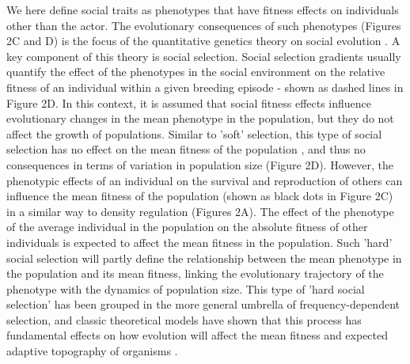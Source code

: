 \documentclass{article}
\begin{document}
We here define social traits as phenotypes that have fitness effects on individuals other than the actor. The evolutionary consequences of such phenotypes  (Figures 2C and D) is the focus of the quantitative genetics theory on social evolution \citep{frank1998foundations, Araya-Ajoy2020}. A key component of this theory is social selection. Social selection gradients usually quantify the effect of the phenotypes in the social environment on the relative fitness of an individual within a given breeding episode \citep{Wolf1999SocialSelection} - shown as dashed lines in Figure 2D. In this context, it is assumed that social fitness effects influence evolutionary changes in the mean phenotype in the population, but they do not affect the growth of populations. Similar to 'soft' selection, this type of social selection has no effect on the mean fitness of the population \citep{Goodnight1992}, and thus no consequences in terms of variation in population size (Figure 2D). However, the phenotypic effects of an individual on the survival and reproduction of others can influence the mean fitness of the population (shown as black dots in Figure 2C) in a similar way to density regulation (Figures 2A). The effect of the phenotype of the average individual in the population on the absolute fitness of other individuals is expected to affect the mean fitness in the population. Such 'hard' social selection will partly define the relationship between the mean phenotype in the population and its mean fitness, linking the evolutionary trajectory of the phenotype with the dynamics of population size. This type of 'hard social selection' has been grouped in the more general umbrella of frequency-dependent selection, and classic theoretical models have shown that this process has fundamental effects on how evolution will affect the mean fitness and expected adaptive topography of organisms \citep{Wright1969}.
 
\end{document}
